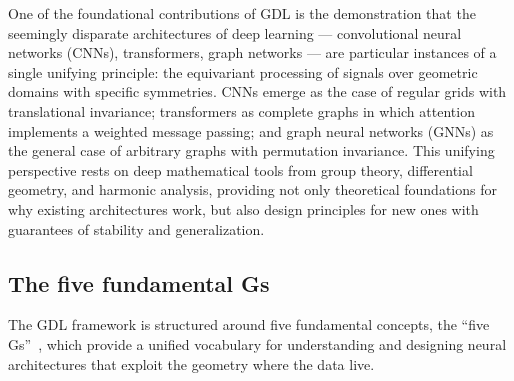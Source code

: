 One of the foundational contributions of GDL is the demonstration that the
seemingly disparate architectures of deep learning --- convolutional neural
networks (CNNs), transformers, graph networks --- are particular instances of a
single unifying principle: the equivariant processing of signals over geometric
domains with specific symmetries. CNNs emerge as the case of regular grids with
translational invariance; transformers as complete graphs in which attention
implements a weighted message passing; and graph neural networks (GNNs) as the
general case of arbitrary graphs with permutation invariance. This unifying
perspective rests on deep mathematical tools from group theory, differential
geometry, and harmonic analysis, providing not only theoretical foundations for
why existing architectures work, but also design principles for new ones with
guarantees of stability and generalization.

\subsection{The five fundamental Gs}
\label{subsec:priors:five-gs}

The GDL framework is structured around five fundamental
concepts, the ``five Gs''~\citep{bronstein2017geometric,
bronstein2021geometric}, which provide a unified vocabulary for understanding
and designing neural architectures that exploit the geometry where the data
live.


